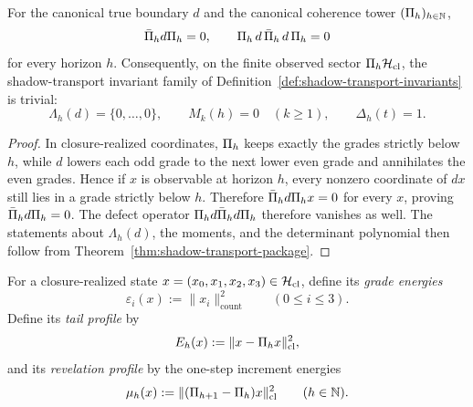 \begin{theorem}
\label{thm:canonical-shadow-collapse}
For the canonical true boundary $d$ and the canonical coherence tower
$(\Pi_{h})_{h\in\mathbb{N}}$,
\[
\bar{\Pi}_{h} d \Pi_{h} = 0,
\qquad
\Pi_{h}\, d \,\bar{\Pi}_{h}\, d \,\Pi_{h}=0
\]
for every horizon $h$. Consequently, on the finite observed sector
$\Pi_{h}\mathcal{H}_{\mathrm{cl}}$, the shadow-transport invariant family of
Definition~\ref{def:shadow-transport-invariants} is trivial:
\[
\Lambda_h(d)=\{0,\dots,0\},
\qquad
M_k(h)=0 \quad (k\ge 1),
\qquad
\Delta_h(t)=1.
\]
\end{theorem}

\begin{proof}
In closure-realized coordinates, $\Pi_{h}$ keeps exactly the grades strictly
below $h$, while $d$ lowers each odd grade to the next lower even grade and
annihilates the even grades. Hence if $x$ is observable at horizon $h$, every
nonzero coordinate of $dx$ still lies in a grade strictly below $h$. Therefore
$\bar{\Pi}_{h} d \Pi_{h}x=0$ for every $x$, proving $\bar{\Pi}_{h} d \Pi_{h}=0$.
The defect operator $\Pi_{h} d \bar{\Pi}_{h} d \Pi_{h}$ therefore vanishes as
well. The statements about $\Lambda_h(d)$, the moments, and the determinant
polynomial then follow from Theorem~\ref{thm:shadow-transport-package}.
\end{proof}

\begin{definition}
\label{def:canonical-tail-profile}
For a closure-realized state $x=(x_0,x_1,x_2,x_3)\in\mathcal{H}_{\mathrm{cl}}$, define
its \emph{grade energies}
\[
\varepsilon_i(x) := \|x_i\|_{\mathrm{count}}^2
\qquad (0\le i\le 3).
\]
Define its \emph{tail profile} by
\[
E_h(x) := \|x-\Pi_{h}x\|_{\mathrm{cl}}^2,
\]
and its \emph{revelation profile} by the one-step increment energies
\[
\mu_h(x) := \|(\Pi_{h+1}-\Pi_{h})x\|_{\mathrm{cl}}^2
\qquad (h\in\mathbb{N}).
\]
\end{definition}

